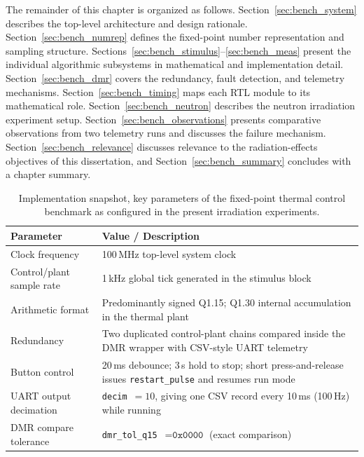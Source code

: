 The remainder of this chapter is organized as follows.
Section~\ref{sec:bench_system} describes the top-level architecture and
design rationale.  Section~\ref{sec:bench_numrep} defines the
fixed-point number representation and sampling structure.
Sections~\ref{sec:bench_stimulus}--\ref{sec:bench_meas} present the
individual algorithmic subsystems in mathematical and implementation
detail.  Section~\ref{sec:bench_dmr} covers the redundancy, fault
detection, and telemetry mechanisms.
Section~\ref{sec:bench_timing} maps each RTL module to its mathematical
role.  Section~\ref{sec:bench_neutron} describes the neutron irradiation
experiment setup.  Section~\ref{sec:bench_observations} presents
comparative observations from two telemetry runs and discusses the
failure mechanism.  Section~\ref{sec:bench_relevance} discusses
relevance to the radiation-effects objectives of this dissertation, and
Section~\ref{sec:bench_summary} concludes with a chapter summary.

\begin{table}[h!]
  \centering
  \caption{Implementation snapshot, key parameters of the fixed-point
           thermal control benchmark as configured in the present
           irradiation experiments.}
  \label{tab:bench_snapshot}
  \renewcommand{\arraystretch}{1.25}
  \begin{tabular}{@{} p{4.5cm} p{9.5cm} @{}}
    \toprule
    \textbf{Parameter} & \textbf{Value / Description} \\
    \midrule
    Clock frequency          & 100\,MHz top-level system clock \\
    Control/plant sample rate & 1\,kHz global tick generated in the stimulus block \\
    Arithmetic format        & Predominantly signed Q1.15; Q1.30 internal
                               accumulation in the thermal plant \\
    Redundancy               & Two duplicated control-plant chains compared
                               inside the DMR wrapper with CSV-style UART telemetry \\
    Button control           & 20\,ms debounce; 3\,s hold to stop; short
                               press-and-release issues \texttt{restart\_pulse}
                               and resumes run mode \\
    UART output decimation   & \texttt{decim}~$= 10$, giving one CSV record
                               every 10\,ms (100\,Hz) while running \\
    DMR compare tolerance    & \texttt{dmr\_tol\_q15}~$= \texttt{0x0000}$
                               (exact comparison) \\
    \bottomrule
  \end{tabular}
\end{table}

